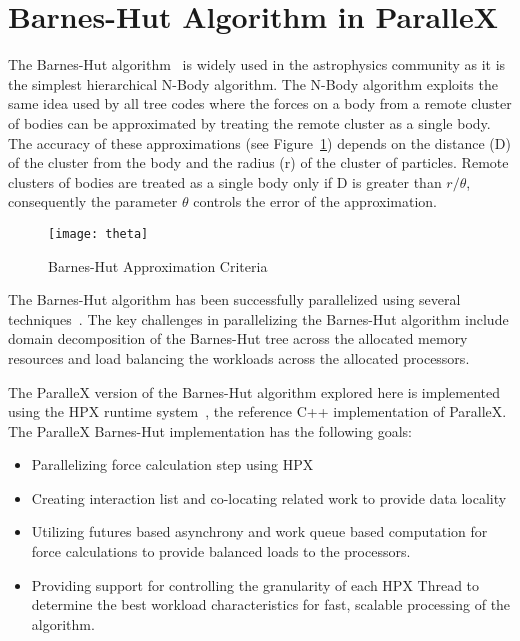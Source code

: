 \documentclass[floatfix]{revtex4}
\begin{document}
\section{Barnes-Hut Algorithm in ParalleX}
\label{barneshut}
The Barnes-Hut algorithm~\cite{barneshut} is widely used in
the astrophysics community as it is
the simplest hierarchical N-Body algorithm. The N-Body algorithm
exploits the same idea used by all tree codes where the forces on a
body from a remote cluster of bodies can be approximated by
treating the remote cluster as a single body. The accuracy of these
approximations (see Figure~\ref{thetafig}) depends on the distance (D) of the cluster from the body
and the radius (r) of the cluster of particles. Remote clusters of bodies
are treated as a single body only if D is greater than $r/\theta$, consequently
the parameter $\theta$ controls the error of the approximation.

\begin{figure}[htp]
\centering
\texttt{[image: theta]}
\caption{Barnes-Hut Approximation Criteria}
\label{thetafig}
\end{figure}

The Barnes-Hut algorithm has been successfully parallelized using several 
techniques~\cite{warren, salmon_thesis, liu, psingh, dubinski, makino}. The key challenges in parallelizing
the Barnes-Hut algorithm include domain decomposition of the Barnes-Hut tree across the
allocated memory resources and load balancing the workloads across the allocated processors.

The ParalleX version of the Barnes-Hut algorithm explored here is implemented using 
the HPX runtime system~\cite{scaling_impaired_apps}, the reference C++ implementation of
ParalleX. The ParalleX Barnes-Hut implementation has the following goals:
\begin{itemize}
\item Parallelizing force calculation step using HPX
\item Creating interaction list and co-locating related work to provide data locality
\item Utilizing futures based asynchrony and work queue based computation for force calculations
to provide balanced loads to the processors.
\item Providing support for controlling the granularity of each HPX Thread to determine the best
workload characteristics for fast, scalable processing of the algorithm.
\end{itemize}
\end{document}
